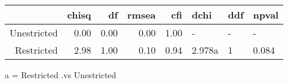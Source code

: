 \begin{table}[ht]
\centering
\begin{tabular}{rrrrrlll}
  \hline
 & chisq & df & rmsea & cfi & dchi & ddf & npval \\ 
  \hline
Unestricted & 0.00 & 0.00 & 0.00 & 1.00 & - & - & - \\ 
  Restricted & 2.98 & 1.00 & 0.10 & 0.94 & 2.978a & 1 & 0.084 \\ 
   \hline
\end{tabular}
\end{table}

a = Restricted .vs Unestricted


